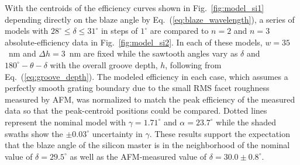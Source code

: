 \documentclass{osa-article}
\begin{document}
With the centroids of the efficiency curves shown in Fig.~\ref{fig:model_si1} depending directly on the blaze angle by Eq.~(\ref{eq:blaze_wavelength}), a series of models with $28^{\circ} \leq \delta \leq 31^{\circ}$ in steps of $1^{\circ}$ are compared to $n=2$ and $n=3$ absolute-efficiency data in Fig.~\ref{fig:model_si2}. 
In each of these models, $w = 35$~nm and $\Delta h = 3$~nm are fixed while the sawtooth angles vary as $\delta$ and $180^{\circ} - \theta - \delta$ with the overall groove depth, $h$, following from Eq.~(\ref{eq:groove_depth}). 
The modeled efficiency in each case, which assumes a perfectly smooth grating boundary due to the small RMS facet roughness measured by AFM, was normalized to match the peak efficiency of the measured data so that the peak-centroid positions could be compared. 
Dotted lines represent the nominal model with $\gamma = 1.71^{\circ}$ and $\alpha = 23.7^{\circ}$ while the shaded swaths show the $\pm 0.03^{\circ}$ uncertainty in $\gamma$. 
These results support the expectation that the blaze angle of the silicon master is in the neighborhood of the nominal value of $\delta = 29.5^{\circ}$ as well as the AFM-measured value of $\delta = 30.0 \pm 0.8^{\circ}$. 
\end{document}
